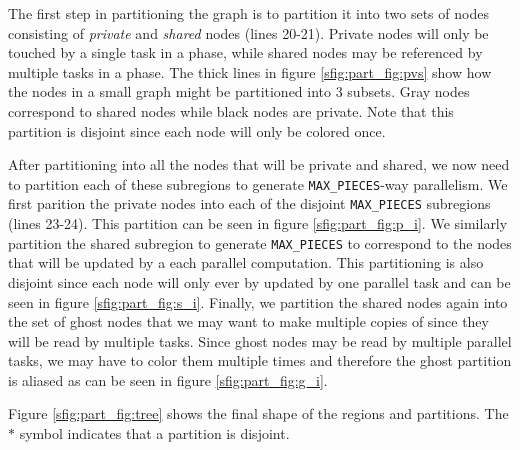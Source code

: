 The first step in partitioning the graph
is to partition it into two sets of nodes consisting of 
{\em private} and {\em shared} nodes (lines 20-21).  Private nodes
will only be touched by a single task in a phase, while shared nodes may
be referenced by multiple tasks in a phase.  The thick lines in figure \ref{sfig:part_fig:pvs}
show how the nodes in a small graph might be partitioned into 3 subsets.  Gray
nodes correspond to shared nodes while black nodes are private.  Note that
this partition is disjoint since each node will only be colored once.

After partitioning into all the nodes that will be private and shared, we now
need to partition each of these subregions to generate {\tt MAX\_PIECES}-way
parallelism.  We first parition the private nodes into each of the disjoint
{\tt MAX\_PIECES} subregions (lines 23-24).  This partition can be seen in figure
\ref{sfig:part_fig:p_i}.  We similarly partition the shared subregion to
generate {\tt MAX\_PIECES} to correspond to the nodes that will be updated
by a each parallel computation.  This partitioning is also disjoint since
each node will only ever by updated by one parallel task and can be
seen in figure \ref{sfig:part_fig:s_i}.  Finally, we partition
the shared nodes again into the set of ghost nodes that we may want to make
multiple copies of since they will be read by multiple tasks.  Since
ghost nodes may be read by multiple parallel tasks, we may have to color
them multiple times and therefore the ghost partition is aliased
as can be seen in figure \ref{sfig:part_fig:g_i}.

Figure \ref{sfig:part_fig:tree} shows the final shape of the regions
and partitions.  The $*$ symbol indicates that a partition is 
disjoint.


